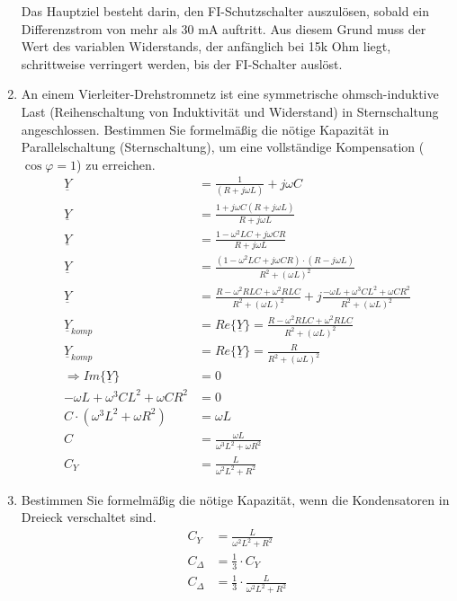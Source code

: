 \begin{enumerate}[label=\alph*)]
	Das Hauptziel besteht darin, den FI-Schutzschalter auszulösen, sobald ein Differenzstrom von mehr als 30 mA auftritt. Aus diesem Grund muss der Wert des variablen Widerstands, der anfänglich bei 15k Ohm liegt, schrittweise verringert werden, bis der FI-Schalter auslöst.

  \item An einem Vierleiter-Drehstromnetz ist eine symmetrische ohmsch-induktive Last (Reihenschaltung von Induktivität und Widerstand) in Sternschaltung angeschlossen. Bestimmen Sie formelmäßig die nötige Kapazität in Parallelschaltung (Sternschaltung), um eine vollständige Kompensation ($\cos \varphi = 1$) zu erreichen. \\
\begin{align*}
  \underline Y &=\frac{1}{(R+j\omega L)}+ {j\omega C}\\
  \underline Y &=\frac{1+ j\omega C(R+j\omega L)}{R+j\omega L}\\
  \underline Y &=\frac{1-\omega^2 LC+ j\omega CR}{R+j\omega L}\\
  \underline Y &=\frac{(1-\omega^2 LC+ j\omega CR) \cdot(R-j\omega L)}{R^2+(\omega L)^2}\\
  \underline Y &=\frac{R-\omega^2 RLC + \omega^2 RLC}{R^2+(\omega L)^2} 
  + j \frac{-\omega L + \omega^3CL^2+\omega CR^2}{R^2+(\omega L)^2}\\
  \underline Y_{komp} &=Re\{\underline Y\}=\frac{R-\omega^2 RLC + \omega^2 RLC}{R^2+(\omega L)^2} \\
  \underline Y_{komp} &=Re\{\underline Y\}=\frac{R}{R^2+(\omega L)^2} \\
  \Rightarrow Im\{\underline Y\}&=0\\
  -\omega L + \omega^3CL^2+\omega CR^2 &= 0\\
  C\cdot(\omega^3L^2+\omega R^2)  &= \omega L \\
  C &=\frac{\omega L}{\omega^3 L^2+\omega R^2}\\
  C_{Y} &=\frac{L}{\omega^2 L^2+R^2}
\end{align*}

  \item Bestimmen Sie formelmäßig die nötige Kapazität, wenn die Kondensatoren in Dreieck verschaltet sind.
    \begin{align*}
      C_{Y} &=\frac{L}{\omega^2 L^2+R^2}\\
      C_{\Delta} &= \frac{1}{3}\cdot C_{Y}\\
      C_{\Delta} &= \frac{1}{3}\cdot \frac{L}{\omega^2 L^2+R^2}\\
    \end{align*}


\end{enumerate}

